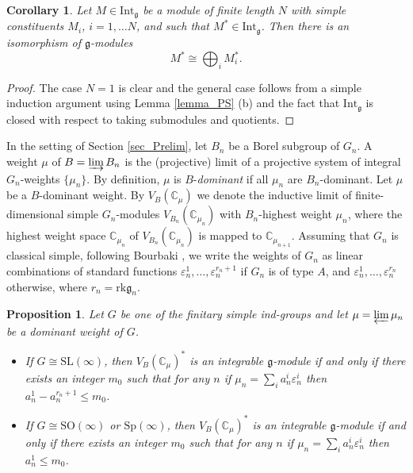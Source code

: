 \documentclass[12pt]{article}
\newcommand{\SL} {\mathrm{SL}}
\newcommand{\SO} {\mathrm{SO}}
\newcommand{\Sp} {\mathrm{Sp}}
\newcommand{\Int} {\mathrm{Int}}
\def\CC {{\mathbb C}}     %
\def \g {\mathfrak{g}}
\newtheorem{prop}[theorem]{Proposition}
\newtheorem{coro}[theorem]{Corollary}
\begin{document}
\begin{coro} \label{prop_Decomp} Let $M \in \Int_{\g}$ be a module of finite length $N$ with simple constituents $M_i$, $i = 1, \dots N$, and such that $M^* \in \Int_{\g}$. Then there is an isomorphism of $\g$-modules 
$$M^* \cong \bigoplus_i M^*_i.$$
\end{coro}

\begin{proof} The case $N=1$ is clear and the general case follows from a simple induction argument using Lemma \ref{lemma_PS} (b) and the fact that $\Int_{\g}$ is closed with respect to taking submodules and quotients.
\end{proof}


In the setting of Section \ref{sec_Prelim}, let $B_n$ be a Borel subgroup of $G_n$. A weight $\mu$ of $B = \varinjlim B_n$ is the (projective) limit of a projective system of integral $G_n$-weights $\{\mu_n\}$. By definition, $\mu$ is $B$-\textit{dominant} if all $\mu_n$ are $B_n$-dominant. Let $\mu$ be a $B$-dominant weight. By $V_B(\CC_{\mu})$ we denote the inductive limit of finite-dimensional simple $G_n$-modules $V_{B_n}(\CC_{\mu_n})$ with $B_n$-highest weight $\mu_n$, where the highest weight space $\CC_{\mu_n}$ of $V_{B_n}(\CC_{\mu_n})$ is mapped to $\CC_{\mu_{n+1}}$. Assuming that $G_n$ is classical simple, following Bourbaki \cite{B}, we write the weights of $G_n$ as linear combinations of standard functions $\varepsilon_n^1, \dots, \varepsilon_n^{r_n +1}$ if $G_n$ is of type $A$, and $\varepsilon_n^1, \dots, \varepsilon_n^{r_n}$ otherwise, where $r_n = \mathrm{rk} \g_n$.


\begin{prop} \label{prop_FinitaryCaseIntegrable} Let $G$ be one of the finitary simple ind-groups and let $\mu = \varprojlim \mu_n$ be a dominant weight of $G$.
\begin{itemize}
\item[(i)] If $G \cong \SL(\infty)$, then $V_B(\CC_{\mu})^*$ is an integrable $\g$-module if and only if there exists an integer $m_0$ such that for any $n$ if $\mu_n = \sum_i a_n^i \varepsilon_n^i$ then $a_n^{1} - a_n^{r_n +1} \leq m_0$.
\item[(ii)] If $G \cong \SO(\infty)$ or $\Sp(\infty)$, then $V_B(\CC_{\mu})^*$ is an integrable $\g$-module if and only if there exists an integer $m_0$ such that for any $n$ if $\mu_n = \sum_i a_n^i \varepsilon_n^i$ then $a_n^{1} \leq m_0$.
\end{itemize}
\end{prop}
\end{document}
